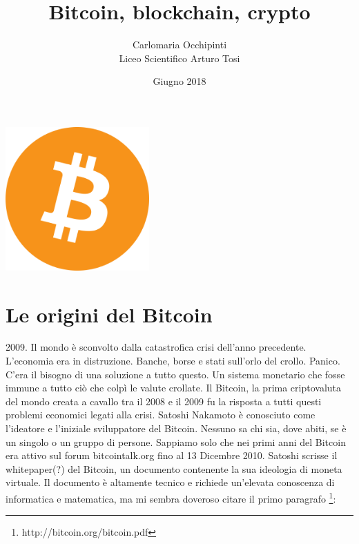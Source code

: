 \documentclass {article}
\title {{\Huge Bitcoin, blockchain, crypto}}
\author {Carlomaria Occhipinti\\Liceo Scientifico Arturo Tosi}
\date {Giugno 2018}
\begin{document}
\maketitle

\vspace {2.5cm}

\begin {center}
   \includegraphics [width = 5.5cm] {media/logo.png}
\end {center}


\newpage

\tableofcontents


\newpage


\section {Le origini del Bitcoin}


2009. Il mondo è sconvolto dalla catastrofica crisi dell'anno precedente.
L'economia era in distruzione. Banche, borse e stati sull'orlo del crollo. Panico.
C'era il bisogno di una soluzione a tutto questo. Un sistema monetario che fosse immune a tutto ciò che colpì le valute crollate. Il Bitcoin, la prima criptovaluta del mondo creata a cavallo tra il 2008 e il 2009 fu la risposta a tutti questi problemi economici legati alla crisi.
Satoshi Nakamoto è conosciuto come l'ideatore e l'iniziale sviluppatore del Bitcoin. Nessuno sa chi sia, dove abiti, se è un singolo o un gruppo di persone. Sappiamo solo che nei primi anni del Bitcoin era attivo sul forum bitcointalk.org fino al 13 Dicembre 2010.
Satoshi scrisse il whitepaper(?) del Bitcoin, un documento contenente la sua ideologia di moneta virtuale. Il documento è altamente tecnico e richiede un'elevata conoscenza di informatica e matematica, ma mi sembra doveroso citare il primo paragrafo \footnote{http://bitcoin.org/bitcoin.pdf}:\\
\end{document}
